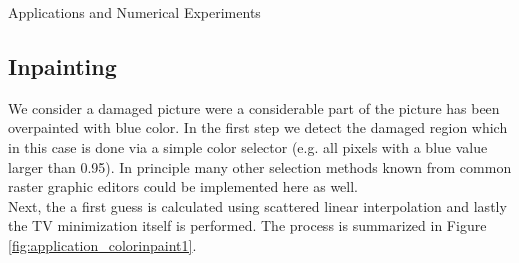 \begin{chapter}{Applications and Numerical Experiments}
\FloatBarrier
\subsection{Inpainting} %
We consider a damaged picture were a considerable part of the picture has been overpainted with blue color. In the first step we detect the damaged region which in this
case is done via a simple color selector (e.g. all pixels with a blue value larger than 0.95). In principle many other selection methods known from common raster graphic editors
could be implemented here as well. \\
Next, the a first guess is calculated using scattered linear interpolation and lastly the TV minimization itself is performed. The process is summarized in Figure 
\ref{fig:application_colorinpaint1}.


\end{chapter}
